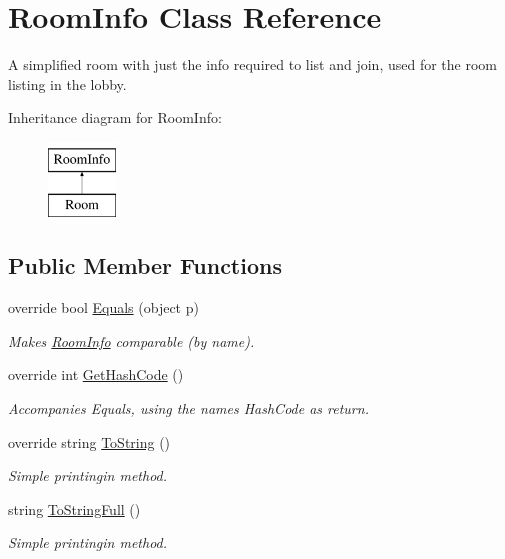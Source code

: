 \hypertarget{class_room_info}{}\section{Room\+Info Class Reference}
\label{class_room_info}


A simplified room with just the info required to list and join, used for the room listing in the lobby.  


Inheritance diagram for Room\+Info\+:\begin{figure}[H]
\begin{center}
\leavevmode
\includegraphics[height=2.000000cm]{class_room_info}
\end{center}
\end{figure}
\subsection*{Public Member Functions}
\begin{DoxyCompactItemize}
\item 
override bool \hyperlink{class_room_info_aeb8511ae1e05be7879605e4b19152733}{Equals} (object p)
\begin{DoxyCompactList}\small\item\em Makes \hyperlink{class_room_info}{Room\+Info} comparable (by name). \end{DoxyCompactList}\item 
override int \hyperlink{class_room_info_a016c74172ba8d6be63ed46526e0eebd4}{Get\+Hash\+Code} ()
\begin{DoxyCompactList}\small\item\em Accompanies Equals, using the name\textquotesingle{}s Hash\+Code as return. \end{DoxyCompactList}\item 
override string \hyperlink{class_room_info_ad299fe650504477562a3cdf0609aa0eb}{To\+String} ()
\begin{DoxyCompactList}\small\item\em Simple printingin method. \end{DoxyCompactList}\item 
string \hyperlink{class_room_info_a4ad3e14e919adab20770874e5b2a8e5d}{To\+String\+Full} ()
\begin{DoxyCompactList}\small\item\em Simple printingin method. \end{DoxyCompactList}\end{DoxyCompactItemize}
